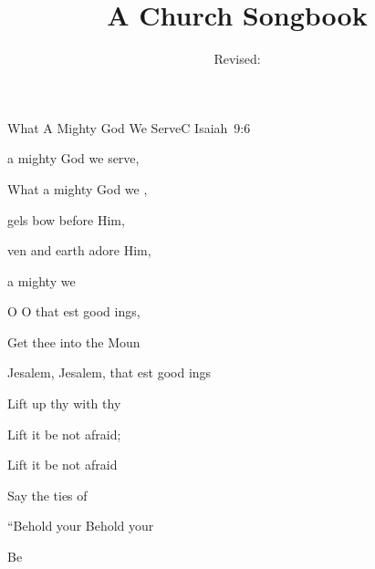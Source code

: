 \documentclass[a5paper,11pt]{book}
\title{A Church Songbook}
\author{}
\date{Revised:  \RevDate}
\newcommand{\RevDate}{\today}
\newcommand{\NotCCLIed}{\relax}
\begin{document}
\maketitle

\mainmatter
\ifWordBk
  \twocolumn
\fi

\begin{song}{What A Mighty God We Serve}{C}
  {\SBPubDom}
  {}
  {Isaiah~9:6}
  {\NotCCLIed}

  \renewcommand{\RevDate}{February~11,~1993}

  \begin{SBOpGroup}
     a mighty God we serve,
    
    What a mighty God we ,
    
    gels bow before Him,
    
    ven and earth adore Him,
    
     a mighty  we \Ch{[}{} \Ch{]}{}
  \end{SBOpGroup}

  \begin{SBVerse}
    O  O  that est good ings,

    Get thee  into the  Moun

    Jesalem, Jesalem, that est good ings

    Lift up thy  with  thy 

    Lift it  be not afraid;

    Lift it  be not afraid

    Say  the ties of 

    ``Behold your  Behold your 

    Be  
  \end{SBVerse}

  \begin{SBExtraKeys}{
  \CBPageBrk
  \CSColBrk

}
\end{SBExtraKeys}
\end{song}
\end{document}
